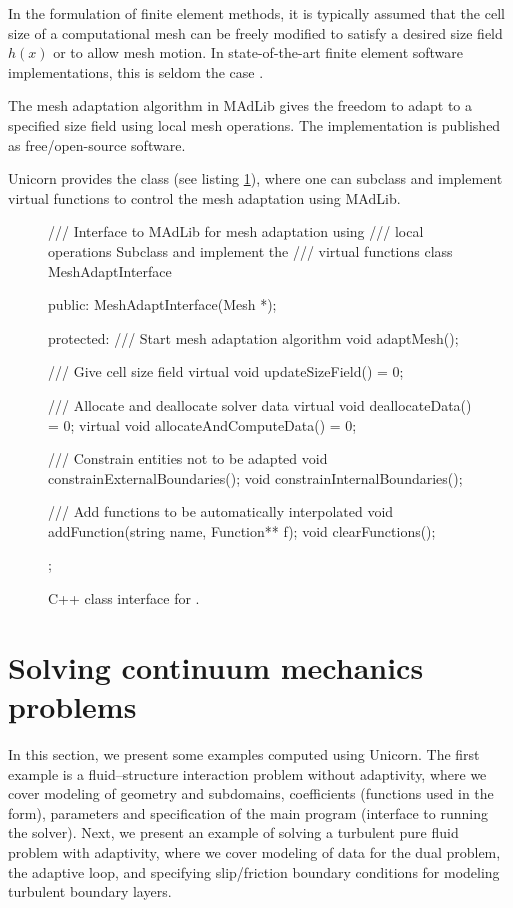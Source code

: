 In the formulation of finite element methods, it is typically assumed
that the cell size of a computational mesh can be freely modified to
satisfy a desired size field $h(x)$ or to allow mesh motion. In
state-of-the-art finite element software implementations, this is
seldom the case \citep{BangerthHartmannKanschat2007, COMSOL2009}.

The mesh adaptation algorithm in MAdLib gives the freedom to adapt to
a specified size field using local mesh operations. The implementation
is published as free/open-source software.

Unicorn provides the  class (see listing
\ref{code:MeshAdaptInterface}), where one can subclass and implement
virtual functions to control the mesh adaptation using MAdLib.

\begin{figure}
\bwfig
\begin{c++}
/// Interface to MAdLib for mesh adaptation using
/// local operations Subclass and implement the
/// virtual functions
class MeshAdaptInterface
{
public:
  MeshAdaptInterface(Mesh *);

protected:
  /// Start mesh adaptation algorithm
  void adaptMesh();

  /// Give cell size field
  virtual void updateSizeField() = 0;

  /// Allocate and deallocate solver data
  virtual void deallocateData() = 0;
  virtual void allocateAndComputeData() = 0;

  /// Constrain entities not to be adapted
  void constrainExternalBoundaries();
  void constrainInternalBoundaries();

  /// Add functions to be automatically interpolated
  void addFunction(string name, Function** f);
  void clearFunctions();
};
\end{c++}
\caption{C++ class interface for .}
\label{code:MeshAdaptInterface}
\end{figure}

\section{Solving continuum mechanics problems}

In this section, we present some examples computed using Unicorn.  The
first example is a fluid--structure interaction problem without
adaptivity, where we cover modeling of geometry and subdomains,
coefficients (functions used in the form), parameters and
specification of the main program (interface to running the
solver). Next, we present an example of solving a turbulent pure fluid
problem with adaptivity, where we cover modeling of data for the dual
problem, the adaptive loop, and specifying slip/friction boundary
conditions for modeling turbulent boundary layers.

